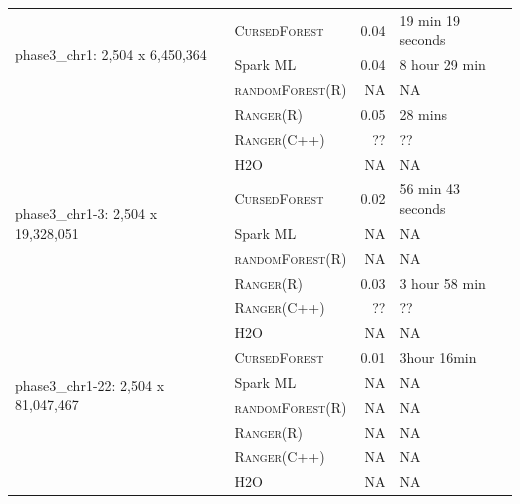 \documentclass[10pt,letterpaper]{article}
\newcommand{\cursedforest}{\textsc{CursedForest}\xspace}
\newcommand{\ranger}{\textsc{Ranger}\xspace}
\newcommand{\randomforest}{\textsc{randomForest}\xspace}
\begin{document}
\begin{table}[!ht]
\begin{minipage}{\textwidth}
\begin{tabular}{| l | l | r | l |}
\multirow{3}{*}{phase3\_chr1: 2,504 x 6,450,364}    & \cursedforest & 0.04  & 19 min 19 seconds         \\
                                                    & Spark ML  & 0.04       & 8 hour 29 min        \\
                                                    & \randomforest (R)        & NA         & NA                \\
                                                    & \ranger (R)      &  0.05       & 28 mins         \\
                                                    & \ranger (C++)     & ??       & ??            \\
                                                    & H2O           & NA       & NA         \\
\hline

\multirow{3}{*}{phase3\_chr1-3: 2,504 x 19,328,051} & \cursedforest & 0.02  & 56 min 43 seconds             \\
                                                    & Spark ML &    NA         &   NA               \\
                                                    & \randomforest (R)        & NA         & NA                \\
                                                    & \ranger (R)      & 0.03      &    3 hour 58 min     \\
                                                    & \ranger (C++)     & ??       & ??            \\
                                                    & H2O           & NA       & NA         \\
\hline

\multirow{4}{*}{phase3\_chr1-22: 2,504 x 81,047,467} & \cursedforest & 0.01  & 3hour 16min \\
                                                    & Spark ML & NA & NA  \\
                                                    & \randomforest (R)        & NA         & NA                \\
                                                    & \ranger (R)       &        NA     &        NA    \\
                                                    & \ranger (C++)       &        NA     &        NA    \\
                                                    & H2O           & NA       & NA         \\
\hline





\end{tabular}
\end{minipage}
\end{table}
\end{document}
